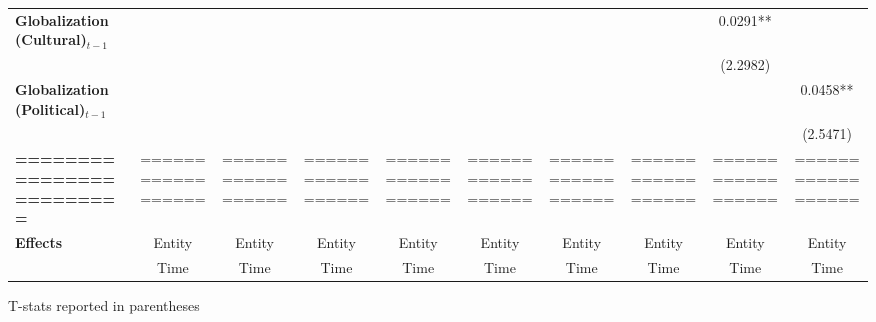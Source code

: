 \begin{center}
\begin{tabular}{lccccccccc}
\textbf{Globalization (Cultural)$_{t-1}$}             &                    &                    &                    &                    &                    &                    &                    &      0.0291**      &                     \\
\textbf{ }                         &                    &                    &                    &                    &                    &                    &                    &      (2.2982)      &                     \\
\textbf{Globalization (Political)$_{t-1}$}             &                    &                    &                    &                    &                    &                    &                    &                    &      0.0458**       \\
\textbf{ }                         &                    &                    &                    &                    &                    &                    &                    &                    &      (2.5471)       \\
\textbf{=========================} & ================== & ================== & ================== & ================== & ================== & ================== & ================== & ================== & ==================  \\
\textbf{Effects}                   &       Entity       &       Entity       &       Entity       &       Entity       &       Entity       &       Entity       &       Entity       &       Entity       &       Entity        \\
\textbf{}                          &        Time        &        Time        &        Time        &        Time        &        Time        &        Time        &        Time        &        Time        &        Time         \\
\bottomrule
\end{tabular}
\end{center}

T-stats reported in parentheses